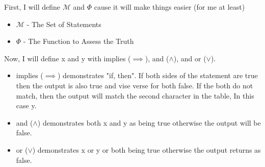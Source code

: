 \documentclass[10pt, AMS Euler]{article}
\begin{document}
\begin{enumerate}
First, I will define $\mathcal{M}$ and $\Phi$ cause it will make things easier (for me at least)
\begin{itemize}
  \item $\mathcal{M}$ - The Set of Statements
  \item $\Phi$ - The Function to Assess the Truth
\end{itemize}  
Now, I will define x and y with implies ($\implies$), and ($\wedge$), and or ($\vee$). 
\begin{itemize}
  \item implies ($\implies$) demonstrates "if, then". If both sides of the statement are true then the output is also true and vise verse for both false. If the both do not match, then the output will match the second character in the table, In this case y. 
  \item and ($\wedge$) demonstrates both x and y as being true otherwise the output will be false. 
  \item or ($\vee$) demonstrates x or y or both being true otherwise the output returns as false.
\end{itemize}  


\end{enumerate}
\end{document}
